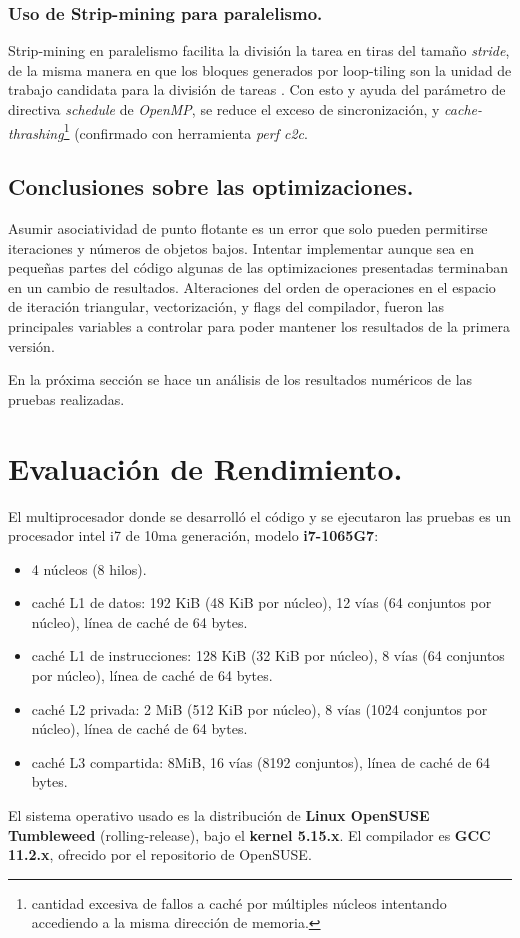 \documentclass{article}
\begin{document}
\subsubsection{Uso de Strip-mining para paralelismo.\label{strip-mining-parallel}}
Strip-mining en paralelismo facilita la división la tarea en tiras del tamaño \textit{stride}, de la misma
manera en que los bloques generados por loop-tiling son la unidad de trabajo candidata para la división
de tareas \cite{Wolfe89moreiteration}. Con esto y ayuda del parámetro de directiva \textit{schedule} de \textit{OpenMP},
se reduce el exceso de sincronización, y \textit{cache-thrashing}\footnote{cantidad excesiva
de fallos a caché por múltiples núcleos intentando accediendo a la misma dirección de memoria.} (confirmado
con herramienta \textit{perf c2c}.

\subsection{Conclusiones sobre las optimizaciones.\label{opt_conclusiones}}
Asumir asociatividad de punto flotante es un error que solo pueden permitirse iteraciones
y números de objetos bajos. Intentar implementar aunque sea en pequeñas partes del código algunas de
las optimizaciones presentadas terminaban en un cambio de resultados. Alteraciones del orden de operaciones
en el espacio de iteración triangular, vectorización, y flags del compilador, fueron las principales
variables a controlar para poder mantener los resultados de la primera versión.

En la próxima sección se hace un análisis de los resultados numéricos de las pruebas realizadas.

\section{Evaluación de Rendimiento.\label{performance}}
El multiprocesador donde se desarrolló el código y se ejecutaron las pruebas es un
procesador intel i7 de 10ma generación, modelo \textbf{i7-1065G7}:
\begin{itemize}
	\item 4 núcleos (8 hilos).
	\item caché L1 de datos: 192 KiB (48 KiB por núcleo), 12 vías (64 conjuntos por núcleo), línea de caché de 64 bytes.
	\item caché L1 de instrucciones: 128 KiB (32 KiB por núcleo), 8 vías (64 conjuntos por núcleo), línea de caché de 64 bytes.
	\item caché L2 privada: 2 MiB (512 KiB por núcleo), 8 vías (1024 conjuntos por núcleo), línea de caché de 64 bytes.
	\item caché L3 compartida: 8MiB, 16 vías (8192 conjuntos), línea de caché de 64 bytes.
\end{itemize}
El sistema operativo usado es la distribución de \textbf{Linux OpenSUSE Tumbleweed} (rolling-release),
bajo el \textbf{kernel 5.15.x}. El compilador es \textbf{GCC 11.2.x}, ofrecido por el repositorio de OpenSUSE.
\end{document}
